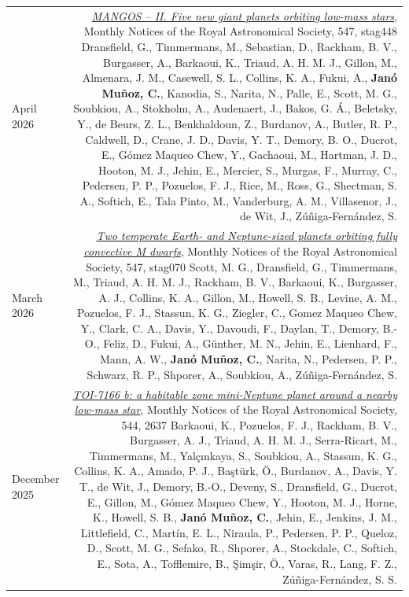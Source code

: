 \documentclass{article}
\newcommand{\me}{\textbf{Janó Muñoz, C.}}
\newcommand{\authlist}[1]{{\footnotesize #1}}
\begin{document}
\begin{longtable}{L!{\vrule}R}
    April 2026 &
    \href{https://ui.adsabs.harvard.edu/abs/2026MNRAS.547ag448D/abstract}{\textit{MANGOS -- II. Five new giant planets orbiting low-mass stars}},
    Monthly Notices of the Royal Astronomical Society, 547, stag448 \newline
    \authlist{Dransfield, G., Timmermans, M., Sebastian, D., Rackham, B. V., Burgasser, A., Barkaoui, K., Triaud, A. H. M. J., Gillon, M., Almenara, J. M., Casewell, S. L., Collins, K. A., Fukui, A., \me, Kanodia, S., Narita, N., Palle, E., Scott, M. G., Soubkiou, A., Stokholm, A., Audenaert, J., Bakos, G. Á., Beletsky, Y., de Beurs, Z. L., Benkhaldoun, Z., Burdanov, A., Butler, R. P., Caldwell, D., Crane, J. D., Davis, Y. T., Demory, B. O., Ducrot, E., Gómez Maqueo Chew, Y., Gachaoui, M., Hartman, J. D., Hooton, M. J., Jehin, E., Mercier, S., Murgas, F., Murray, C., Pedersen, P. P., Pozuelos, F. J., Rice, M., Ross, G., Shectman, S. A., Softich, E., Tala Pinto, M., Vanderburg, A. M., Villasenor, J., de Wit, J., Zúñiga-Fernández, S.} \\

    March 2026 &
    \href{https://ui.adsabs.harvard.edu/abs/2026MNRAS.547ag070S/abstract}{\textit{Two temperate Earth- and Neptune-sized planets orbiting fully convective M dwarfs}},
    Monthly Notices of the Royal Astronomical Society, 547, stag070 \newline
    \authlist{Scott, M. G., Dransfield, G., Timmermans, M., Triaud, A. H. M. J., Rackham, B. V., Barkaoui, K., Burgasser, A. J., Collins, K. A., Gillon, M., Howell, S. B., Levine, A. M., Pozuelos, F. J., Stassun, K. G., Ziegler, C., Gomez Maqueo Chew, Y., Clark, C. A., Davis, Y., Davoudi, F., Daylan, T., Demory, B.-O., Feliz, D., Fukui, A., Günther, M. N., Jehin, E., Lienhard, F., Mann, A. W., \me, Narita, N., Pedersen, P. P., Schwarz, R. P., Shporer, A., Soubkiou, A., Zúñiga-Fernández, S.} \\

    December 2025 &
    \href{https://ui.adsabs.harvard.edu/abs/2025MNRAS.544.2637B/abstract}{\textit{TOI-7166 b: a habitable zone mini-Neptune planet around a nearby low-mass star}},
    Monthly Notices of the Royal Astronomical Society, 544, 2637 \newline
    \authlist{Barkaoui, K., Pozuelos, F. J., Rackham, B. V., Burgasser, A. J., Triaud, A. H. M. J., Serra-Ricart, M., Timmermans, M., Yalçınkaya, S., Soubkiou, A., Stassun, K. G., Collins, K. A., Amado, P. J., Baştürk, Ö., Burdanov, A., Davis, Y. T., de Wit, J., Demory, B.-O., Deveny, S., Dransfield, G., Ducrot, E., Gillon, M., Gómez Maqueo Chew, Y., Hooton, M. J., Horne, K., Howell, S. B., \me, Jehin, E., Jenkins, J. M., Littlefield, C., Martín, E. L., Niraula, P., Pedersen, P. P., Queloz, D., Scott, M. G., Sefako, R., Shporer, A., Stockdale, C., Softich, E., Sota, A., Tofflemire, B., Şimşir, Ö., Varas, R., Lang, F. Z., Zúñiga-Fernández, S. S.} \\


\end{longtable}
\end{document}
